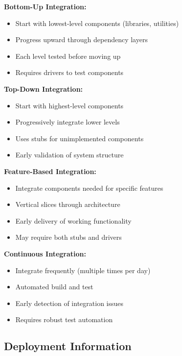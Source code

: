 \documentclass[11pt]{article}
\begin{document}
\begin{devbox}

\textbf{Bottom-Up Integration:}
\begin{itemize}[nosep]
    \item Start with lowest-level components (libraries, utilities)
    \item Progress upward through dependency layers
    \item Each level tested before moving up
    \item Requires drivers to test components
\end{itemize}

\textbf{Top-Down Integration:}
\begin{itemize}[nosep]
    \item Start with highest-level components
    \item Progressively integrate lower levels
    \item Uses stubs for unimplemented components
    \item Early validation of system structure
\end{itemize}

\textbf{Feature-Based Integration:}
\begin{itemize}[nosep]
    \item Integrate components needed for specific features
    \item Vertical slices through architecture
    \item Early delivery of working functionality
    \item May require both stubs and drivers
\end{itemize}

\textbf{Continuous Integration:}
\begin{itemize}[nosep]
    \item Integrate frequently (multiple times per day)
    \item Automated build and test
    \item Early detection of integration issues
    \item Requires robust test automation
\end{itemize}
\end{devbox}

\subsection{Deployment Information}
\end{document}
